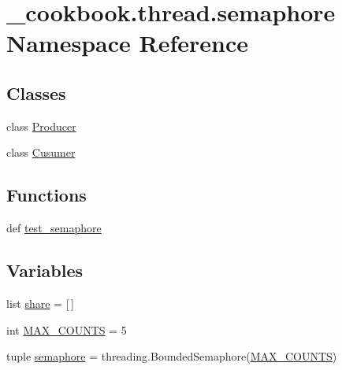 \hypertarget{namespace__cookbook_1_1thread_1_1semaphore}{\section{\-\_\-cookbook.\-thread.\-semaphore Namespace Reference}
\label{namespace__cookbook_1_1thread_1_1semaphore}
}
\subsection*{Classes}
\begin{DoxyCompactItemize}
\item 
class \hyperlink{class__cookbook_1_1thread_1_1semaphore_1_1Producer}{Producer}
\item 
class \hyperlink{class__cookbook_1_1thread_1_1semaphore_1_1Cusumer}{Cusumer}
\end{DoxyCompactItemize}
\subsection*{Functions}
\begin{DoxyCompactItemize}
\item 
def \hyperlink{namespace__cookbook_1_1thread_1_1semaphore_a5fbba75227af2444a9cd91f99d4cca94}{test\-\_\-semaphore}
\end{DoxyCompactItemize}
\subsection*{Variables}
\begin{DoxyCompactItemize}
\item 
list \hyperlink{namespace__cookbook_1_1thread_1_1semaphore_a9a0b5a124aff3e078787972f21d297e3}{share} = \mbox{[}$\,$\mbox{]}
\item 
int \hyperlink{namespace__cookbook_1_1thread_1_1semaphore_a67e6819d1307ed665cb515e3f47a990e}{M\-A\-X\-\_\-\-C\-O\-U\-N\-T\-S} = 5
\item 
tuple \hyperlink{namespace__cookbook_1_1thread_1_1semaphore_a522d222885e9efd1ac70e59a9c880c8f}{semaphore} = threading.\-Bounded\-Semaphore(\hyperlink{namespace__cookbook_1_1thread_1_1semaphore_a67e6819d1307ed665cb515e3f47a990e}{M\-A\-X\-\_\-\-C\-O\-U\-N\-T\-S})
\end{DoxyCompactItemize}


